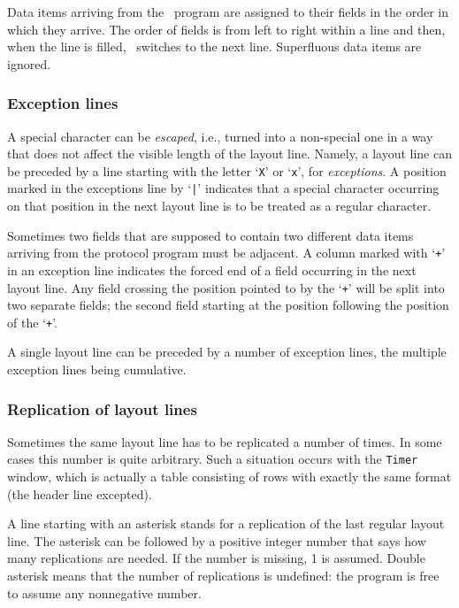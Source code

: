 Data items arriving from the \smurph\ program are assigned to their fields in
the order in which they arrive.
The order of fields is from left to right within a line and then, when the
line is filled, \dsd\ switches to the next line.
Superfluous data items are ignored.

\subsubsection{Exception lines}
\label{rm_ds_tp_ex}

A special character can be {\em escaped}, i.e., turned into a non-special
one in a way that does not affect the visible length of the layout line.
Namely, a layout line can be preceded by a line starting with the letter
`{\tt X}' or `{\tt x}', for {\em exceptions}.
A position marked in the exceptions line by `{\tt |}' indicates that a special
character occurring on that position in the next layout line is to be
treated as a regular character.

Sometimes two fields that are supposed to contain two different data items
arriving from the protocol program must be adjacent.
A column marked with `{\tt +}' in an exception line indicates the forced
end of a field occurring in the next layout line.
Any field crossing the position pointed to by the `{\tt +}' will be
split into two separate fields; the second field starting at the position
following the position of the `{\tt +}'.

A single layout line can be preceded by a number of exception lines, the
multiple exception lines being cumulative.

\subsubsection{Replication of layout lines}
\label{rm_ds_tp_rp}

Sometimes the same layout line has to be replicated a number of times.
In some cases this number is quite arbitrary.
Such a situation occurs with the {\tt Timer} window, which is actually a
table consisting of rows with exactly the same format (the header line
excepted).

A line starting with an asterisk stands for a
replication of the last regular layout line.
The asterisk can be followed by a positive integer number that says how
many replications are needed.
If the number is missing, 1 is assumed.
Double asterisk means that the number of replications is undefined:
the program is free to assume any nonnegative number.

